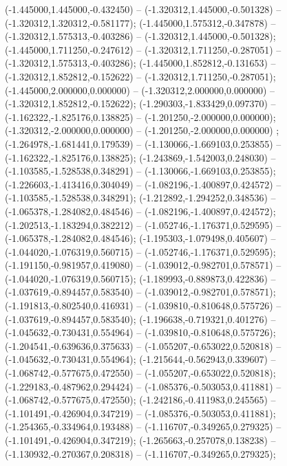  (-1.445000,1.445000,-0.432450) -- (-1.320312,1.445000,-0.501328) -- (-1.320312,1.320312,-0.581177);
 (-1.445000,1.575312,-0.347878) -- (-1.320312,1.575313,-0.403286) -- (-1.320312,1.445000,-0.501328);
 (-1.445000,1.711250,-0.247612) -- (-1.320312,1.711250,-0.287051) -- (-1.320312,1.575313,-0.403286);
 (-1.445000,1.852812,-0.131653) -- (-1.320312,1.852812,-0.152622) -- (-1.320312,1.711250,-0.287051);
 (-1.445000,2.000000,0.000000) -- (-1.320312,2.000000,0.000000) -- (-1.320312,1.852812,-0.152622);
 (-1.290303,-1.833429,0.097370) -- (-1.162322,-1.825176,0.138825) -- (-1.201250,-2.000000,0.000000);
 (-1.320312,-2.000000,0.000000) -- (-1.201250,-2.000000,0.000000) ;
 (-1.264978,-1.681441,0.179539) -- (-1.130066,-1.669103,0.253855) -- (-1.162322,-1.825176,0.138825);
 (-1.243869,-1.542003,0.248030) -- (-1.103585,-1.528538,0.348291) -- (-1.130066,-1.669103,0.253855);
 (-1.226603,-1.413416,0.304049) -- (-1.082196,-1.400897,0.424572) -- (-1.103585,-1.528538,0.348291);
 (-1.212892,-1.294252,0.348536) -- (-1.065378,-1.284082,0.484546) -- (-1.082196,-1.400897,0.424572);
 (-1.202513,-1.183294,0.382212) -- (-1.052746,-1.176371,0.529595) -- (-1.065378,-1.284082,0.484546);
 (-1.195303,-1.079498,0.405607) -- (-1.044020,-1.076319,0.560715) -- (-1.052746,-1.176371,0.529595);
 (-1.191150,-0.981957,0.419080) -- (-1.039012,-0.982701,0.578571) -- (-1.044020,-1.076319,0.560715);
 (-1.189993,-0.889873,0.422836) -- (-1.037619,-0.894457,0.583540) -- (-1.039012,-0.982701,0.578571);
 (-1.191813,-0.802540,0.416931) -- (-1.039810,-0.810648,0.575726) -- (-1.037619,-0.894457,0.583540);
 (-1.196638,-0.719321,0.401276) -- (-1.045632,-0.730431,0.554964) -- (-1.039810,-0.810648,0.575726);
 (-1.204541,-0.639636,0.375633) -- (-1.055207,-0.653022,0.520818) -- (-1.045632,-0.730431,0.554964);
 (-1.215644,-0.562943,0.339607) -- (-1.068742,-0.577675,0.472550) -- (-1.055207,-0.653022,0.520818);
 (-1.229183,-0.487962,0.294424) -- (-1.085376,-0.503053,0.411881) -- (-1.068742,-0.577675,0.472550);
 (-1.242186,-0.411983,0.245565) -- (-1.101491,-0.426904,0.347219) -- (-1.085376,-0.503053,0.411881);
 (-1.254365,-0.334964,0.193488) -- (-1.116707,-0.349265,0.279325) -- (-1.101491,-0.426904,0.347219);
 (-1.265663,-0.257078,0.138238) -- (-1.130932,-0.270367,0.208318) -- (-1.116707,-0.349265,0.279325);
